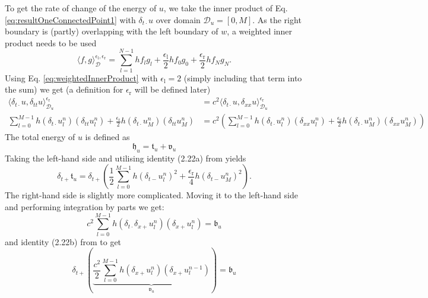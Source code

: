 \documentclass[dvipsnames]{article}
\begin{document}
To get the rate of change of the energy of $u$, we take the inner product of Eq. \eqref{eq:resultOneConnectedPoint1} with $\delta_{t\cdot}u$ over domain $\mathcal{D}_u = [0, M]$. As the right boundary is (partly) overlapping with the left boundary of $w$, a weighted inner product needs to be used
\begin{equation}\label{eq:weightedInnerProduct}
    \langle f,g \rangle_{\mathcal{D}}^{\epsilon_\text{l}, \epsilon_\text{r}}= \sum_{l = 1}^{N-1}hf_lg_l + \frac{\epsilon_\text{l}}{2}hf_0g_0 + \frac{\epsilon_\text{r}}{2}hf_Ng_N.
\end{equation}
Using Eq. \eqref{eq:weightedInnerProduct} with $\epsilon_\text{l} = 2$ (simply including that term into the sum) we get (a definition for $\epsilon_\text{r}$ will be defined later)
\begin{align*}
    \langle \delta_{t\cdot}u, \delta_{tt}u\rangle_{\mathcal{D}_u}^{\epsilon_\text{r}} &= c^2 \langle \delta_{t\cdot}u, \delta_{xx}u\rangle_{\mathcal{D}_u}^{\epsilon_\text{r}}\\
    \sum_{l = 0}^{M-1}h(\delta_{t\cdot}u_l^n)(\delta_{tt}u_l^n) + \frac{\epsilon_\text{r}}{2}h(\delta_{t\cdot}u_M^n)(\delta_{tt}u_M^n) &= c^2\left(\sum_{l = 0}^{M-1}h(\delta_{t\cdot}u_l^n)(\delta_{xx}u_l^n) + \frac{\epsilon_\text{r}}{2}h(\delta_{t\cdot}u_M^n)(\delta_{xx}u_M^n)\right)
\end{align*}
The total energy of $u$ is defined as
\begin{equation}
    \mathfrak{h}_u = \mathfrak{t}_u + \mathfrak{v}_u
\end{equation}
%
Taking the left-hand side and utilising identity (2.22a) from \cite{Bilbao2009} yields
\begin{equation}
    \delta_{t+}\mathfrak{t}_u = \delta_{t+}\left(\frac{1}{2}\sum_{l=0}^{M-1}h(\delta_{t-}u_l^n)^2 + \frac{\epsilon_\text{r}}{4}h(\delta_{t-}u_M^n)^2\right).
\end{equation}
The right-hand side is slightly more complicated. Moving it to the left-hand side and performing integration by parts we get:
\begin{equation*}
    c^2 \sum_{l=0}^{M-1} h (\delta_{t\cdot}\delta_{x+}u_l^n)(\delta_{x+}u_l^n) = \mathfrak{b}_u
\end{equation*}
and identity (2.22b) from \cite{Bilbao2009} to get 
\begin{equation}
    \delta_{t+}\left(\underbrace{\frac{c^2}{2} \sum_{l=0}^{M-1} h (\delta_{x+}u_l^n)(\delta_{x+}u_l^{n-1})}_{\mathfrak{v}_u}\right) = \mathfrak{b}_u
\end{equation}
\end{document}
